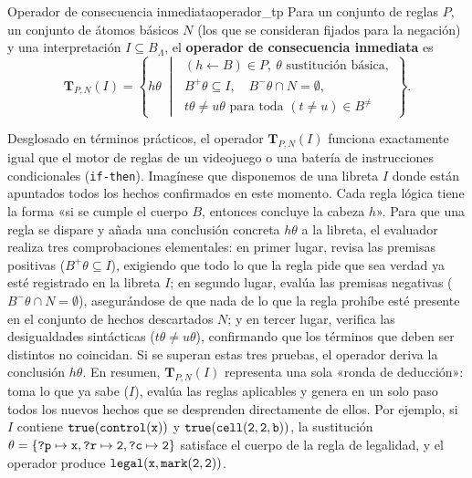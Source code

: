 \begin{definicion}{Operador de consecuencia inmediata}{operador_tp}
Para un conjunto de reglas $P$, un conjunto de átomos básicos $N$ (los que se consideran fijados para la negación) y una interpretación $I \subseteq B_\Lambda$, el \textbf{operador de consecuencia inmediata} es
\begin{equation}
    \mathbf T_{P,N}(I) = \left\{ h\theta \;\middle|\;
    \begin{array}{l}
        (h \leftarrow B) \in P,\ \theta \text{ sustitución básica},\\
        B^+\theta \subseteq I,\quad B^-\theta \cap N = \emptyset,\\
        t\theta \ne u\theta \text{ para toda } (t \neq u) \in B^{\neq}
    \end{array}
    \right\}.
    \label{eq:an_tp}
\end{equation}
\end{definicion}

Desglosado en términos prácticos, el operador $\mathbf T_{P,N}(I)$ funciona exactamente igual que el motor de reglas de un videojuego o una batería de instrucciones condicionales (\texttt{if-then}). Imagínese que disponemos de una libreta $I$ donde están apuntados todos los hechos confirmados en este momento. Cada regla lógica tiene la forma «si se cumple el cuerpo $B$, entonces concluye la cabeza $h$». Para que una regla se dispare y añada una conclusión concreta $h\theta$ a la libreta, el evaluador realiza tres comprobaciones elementales:
en primer lugar, revisa las premisas positivas ($B^+\theta \subseteq I$), exigiendo que todo lo que la regla pide que sea verdad ya esté registrado en la libreta $I$;
en segundo lugar, evalúa las premisas negativas ($B^-\theta \cap N = \emptyset$), asegurándose de que nada de lo que la regla prohíbe esté presente en el conjunto de hechos descartados $N$;
y en tercer lugar, verifica las desigualdades sintácticas ($t\theta \neq u\theta$), confirmando que los términos que deben ser distintos no coincidan.
Si se superan estas tres pruebas, el operador deriva la conclusión $h\theta$. En resumen, $\mathbf T_{P,N}(I)$ representa una sola «ronda de deducción»: toma lo que ya sabe ($I$), evalúa las reglas aplicables y genera en un solo paso todos los nuevos hechos que se desprenden directamente de ellos. Por ejemplo, si $I$ contiene $\texttt{true}(\texttt{control}(\texttt{x}))$ y $\texttt{true}(\texttt{cell}(\texttt{2}, \texttt{2}, \texttt{b}))$, la sustitución $\theta = \{\texttt{?p} \mapsto \texttt{x}, \texttt{?r} \mapsto \texttt{2}, \texttt{?c} \mapsto \texttt{2}\}$ satisface el cuerpo de la regla de legalidad, y el operador produce $\texttt{legal}(\texttt{x}, \texttt{mark}(\texttt{2}, \texttt{2}))$.

